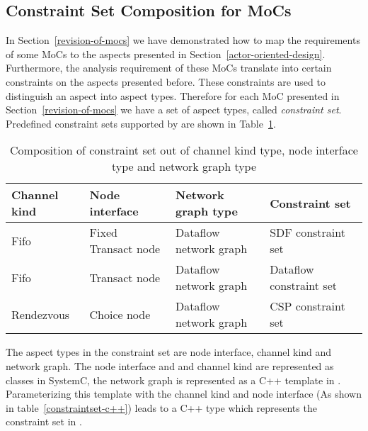 \subsection{Constraint Set Composition for MoCs}

In Section~\ref{revision-of-mocs} we have demonstrated how
to map the requirements of some MoCs to the aspects presented
in Section~\ref{actor-oriented-design}. Furthermore, the analysis
requirement of these MoCs translate into certain constraints
on the aspects presented before. These constraints are
used to distinguish an aspect into aspect types. Therefore
for each MoC presented in Section~\ref{revision-of-mocs}
we have a set of aspect types, called \emph{constraint set}.
Predefined constraint sets supported by \SysteMoC{} are
shown in Table~\ref{constraintset-composition}.

\begin{table}[h]
\centering
\begin{tabular}{|l|l|l|l|}
\hline
 Channel kind & Node interface & Network graph type & Constraint set \\
\hline \hline
 Fifo         & Fixed Transact node & Dataflow network graph & SDF constraint set \\
 Fifo         & Transact node       & Dataflow network graph & Dataflow constraint set \\
 Rendezvous   & Choice node         & Dataflow network graph & CSP constraint set \\
\hline
\end{tabular}
\caption{\label{constraintset-composition}
  Composition of constraint set out of channel kind type, node interface type
  and network graph type}
\end{table}

The aspect types in the constraint set are node interface,
channel kind and network graph. The node interface and
and channel kind are represented as \SysteMoC{} classes in
SystemC, the network graph is represented as
a C++ template in \SysteMoC{}. Parameterizing this template
with the channel kind and node interface (As shown in
table~\ref{constraintset-c++}) leads to a C++
type which represents the constraint set in \SysteMoC{}.

